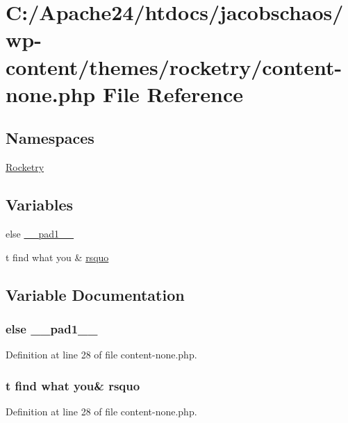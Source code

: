 \hypertarget{content-none_8php}{}\section{C\+:/\+Apache24/htdocs/jacobschaos/wp-\/content/themes/rocketry/content-\/none.php File Reference}
\label{content-none_8php}
\subsection*{Namespaces}
\begin{DoxyCompactItemize}
\item 
 \hyperlink{namespace_rocketry}{Rocketry}
\end{DoxyCompactItemize}
\subsection*{Variables}
\begin{DoxyCompactItemize}
\item 
else \hyperlink{content-none_8php_ae8b4bb1441c6ab4dcb28a37bc46c8ead}{\+\_\+\+\_\+pad1\+\_\+\+\_\+}
\item 
t find what you \& \hyperlink{content-none_8php_a40503011d60eee9284cd26a6872dc38e}{rsquo}
\end{DoxyCompactItemize}


\subsection{Variable Documentation}
\hypertarget{content-none_8php_ae8b4bb1441c6ab4dcb28a37bc46c8ead}{}
\subsubsection[{\+\_\+\+\_\+pad1\+\_\+\+\_\+}]{\setlength{\rightskip}{0pt plus 5cm}else \+\_\+\+\_\+pad1\+\_\+\+\_\+}\label{content-none_8php_ae8b4bb1441c6ab4dcb28a37bc46c8ead}


Definition at line 28 of file content-\/none.\+php.

\hypertarget{content-none_8php_a40503011d60eee9284cd26a6872dc38e}{}
\subsubsection[{rsquo}]{\setlength{\rightskip}{0pt plus 5cm}t find what you\& rsquo}\label{content-none_8php_a40503011d60eee9284cd26a6872dc38e}


Definition at line 28 of file content-\/none.\+php.

